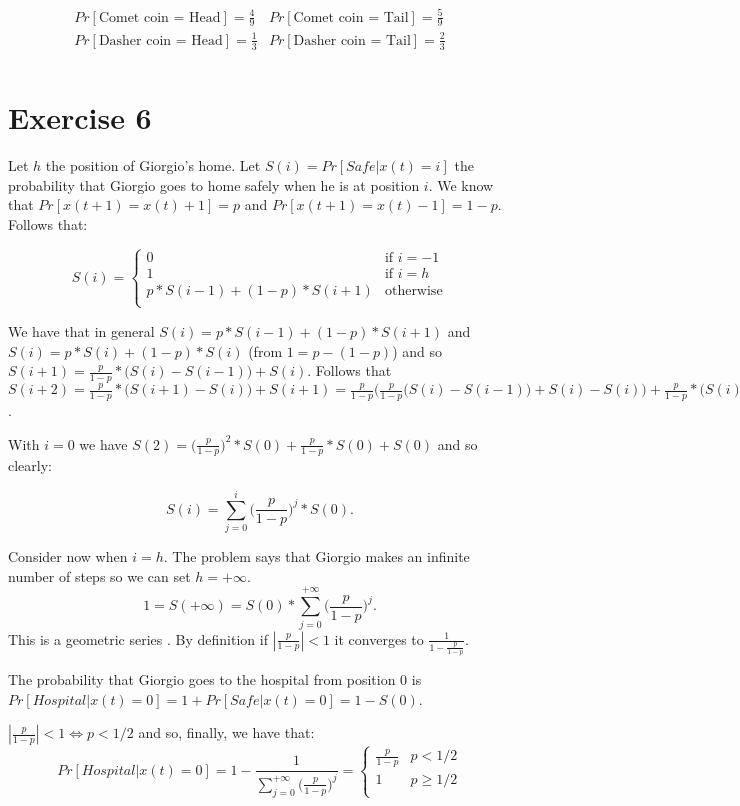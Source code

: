\documentclass[paper=a4, fontsize=11pt]{scrartcl} %
\numberwithin{equation}{section} %
\numberwithin{figure}{section} %
\numberwithin{table}{section} %
\begin{document}
\[
    \begin{array}{ll}
    Pr[\text{Comet coin = Head}] = \frac{4}{9} & Pr[\text{Comet coin = Tail}] = \frac{5}{9} \\
    Pr[\text{Dasher coin = Head}] = \frac{1}{3} & Pr[\text{Dasher coin = Tail}] = \frac{2}{3} \\
    \end{array}
\]

\section{Exercise 6}

Let $h$ the position of Giorgio's home.
Let $S(i) = Pr[Safe|x(t)=i]$ the probability that Giorgio goes to home safely when he is at position $i$. We know that $Pr[x(t+1) = x(t)+1] = p$ and $Pr[x(t+1) = x(t)-1] = 1-p$. Follows that:

\[
S(i) = \begin{cases}
0 & \text{if }i = -1 \\
1 & \text{if }i = h \\
p*S(i-1) + (1-p)*S(i+1) & \text{otherwise} \\
\end{cases}
\]

We have that in general $S(i) = p*S(i-1) + (1-p)*S(i+1)$ and $S(i) = p*S(i) + (1-p)*S(i)$ (from $1 = p - (1-p)$) and so $S(i+1) = \frac{p}{1-p}*\big(S(i) - S(i-1)\big) + S(i)$.
Follows that $S(i+2) = \frac{p}{1-p}*\big(S(i+1) - S(i)\big) + S(i+1) = \frac{p}{1-p}\Big(\frac{p}{1-p}\big(S(i) - S(i-1)\big) + S(i) - S(i)\Big) + \frac{p}{1-p}*\big(S(i) - S(i-1)\big) + S(i)$.

With $i = 0$ we have $S(2) = \big(\frac{p}{1-p})^2*S(0) + \frac{p}{1-p}*S(0) + S(0)$ and so clearly:

\[
S(i) = \sum_{j=0}^{i} \Big(\frac{p}{1-p}\Big)^j*S(0).
\]

Consider now when $i = h$. The problem says that Giorgio makes an infinite number of steps so we can set $h = +\infty$.
\[
1 = S(+\infty) = S(0)*\sum_{j=0}^{+\infty} \Big(\frac{p}{1-p}\Big)^j.
\]
This is a geometric series \cite{geo}. By definition if $|\frac{p}{1-p}| < 1$ it converges to $\frac{1}{1-\frac{p}{1-p}}$.

The probability that Giorgio goes to the hospital from position 0 is $Pr[Hospital|x(t)=0] = 1 + Pr[Safe|x(t)=0] = 1 - S(0)$.

$|\frac{p}{1-p}| < 1 \Leftrightarrow p < 1/2$ and so, finally, we have that:
\[
Pr[Hospital|x(t)=0] = 1 - \frac{1}{\sum_{j=0}^{+\infty} \big(\frac{p}{1-p}\big)^j} = \begin{cases}
\frac{p}{1-p} & p < 1/2 \\
1 & p \geq 1/2 \\
\end{cases}
\]
\end{document}
